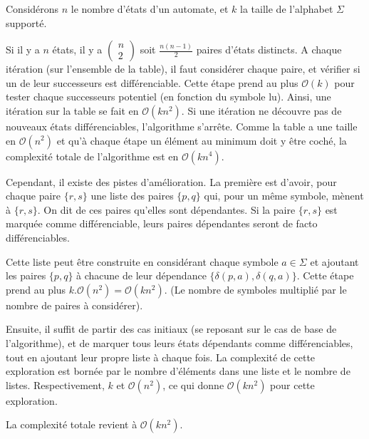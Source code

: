 \begin{complexity}

Considérons $n$ le nombre d'états d'un automate, et $k$ la taille de l'alphabet $\Sigma$ supporté.

Si il y a $n$ états, il y a $\begin{pmatrix}n\\2\end{pmatrix}$ soit $\frac{n(n-1)}{2}$ paires d'états distincts. A chaque itération (sur l'ensemble de la table), il faut considérer chaque paire, et vérifier si un de leur successeurs est différenciable. Cette étape prend au plus $\mathcal{O}(k)$ pour tester chaque successeurs potentiel (en fonction du symbole lu).  Ainsi, une itération sur la table se fait en $\mathcal{O}(kn^2)$. Si une itération ne découvre pas de nouveaux états différenciables, l'algorithme s'arrête. Comme la table a une taille en $\mathcal{O}(n^2)$ et qu'à chaque étape un élément au minimum doit y être coché, la complexité totale de l'algorithme est en $\mathcal{O}(kn^4)$.

Cependant, il existe des pistes d'amélioration. La première est d'avoir, pour chaque paire $\{r,s\}$ une liste des paires $\{p,q\}$ qui, pour un même symbole, mènent à $\{r,s\}$. On dit de ces paires qu'elles sont dépendantes. Si la paire $\{r,s\}$ est marquée comme différenciable, leurs paires dépendantes seront de facto différenciables.

Cette liste peut être construite en considérant chaque symbole $a \in \Sigma$ et ajoutant les paires $\{p,q\}$ à chacune de leur dépendance $\{\delta(p,a),\delta(q,a)\}$. Cette étape prend au plus $k.\mathcal{O}(n^2)=\mathcal{O}(kn^2)$. (Le nombre de symboles multiplié par le nombre de paires à considérer).

Ensuite, il suffit de partir des cas initiaux (se reposant sur le cas de base de l'algorithme), et de marquer tous leurs états dépendants comme différenciables, tout en ajoutant leur propre liste à chaque fois. La complexité de cette exploration est bornée par le nombre d'éléments dans une liste et le nombre de listes. Respectivement, $k$ et $\mathcal{O}(n^2)$, ce qui donne $\mathcal{O}(kn^2)$ pour cette exploration.

La complexité totale revient à $\mathcal{O}(kn^2)$.
\end{complexity}



